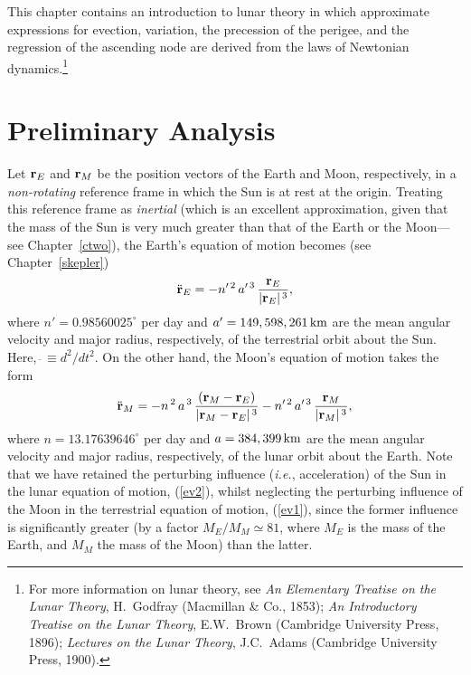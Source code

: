 This chapter contains an introduction to lunar theory in which approximate expressions for evection, variation,
the precession of the perigee,  and the regression of the ascending node are derived from the  laws of Newtonian dynamics.\footnote{For more information on lunar theory, see  {\em An Elementary Treatise on the Lunar Theory}, H.~Godfray (Macmillan \& Co.,  1853);  {\em An Introductory Treatise on the Lunar Theory}, E.W.~Brown (Cambridge University Press, 1896); {\em Lectures on the Lunar Theory}, J.C.~Adams (Cambridge University Press, 1900).}

\section{Preliminary Analysis}
Let ${\bf r}_E$ and ${\bf r}_M$ be the position vectors of the Earth and Moon, respectively, in a  {\em non-rotating}\/
reference frame in which the Sun is at rest at the origin.  Treating this reference frame as {\em inertial}\/  (which  is an
excellent  approximation, given that the  mass of the Sun is very much greater than that of the Earth or the Moon---see Chapter~\ref{ctwo}),
the Earth's
equation of motion becomes (see Chapter~\ref{skepler})
\begin{equation}\label{ev1}
\ddot{\bf r}_E  = - n'^{\,2}\,a'^{\,3}\,\frac{{\bf r}_E}{|{\bf r}_E|^{\,3}},
\end{equation}
where $n'=0.98560025^\circ$ per day and $a'=149,598,261\,{\rm km}$ are the mean angular velocity and major radius, respectively, of the
terrestrial orbit about the Sun. Here, $\ddot{~}\equiv d^2/dt^2$. On the other hand, the Moon's equation of motion takes the form
\begin{equation}\label{ev2}
\ddot{\bf r}_M  = - n^{\,2}\,a^{\,3}\,\frac{({\bf r}_M-{\bf r}_E)}{|{\bf r}_M-{\bf r}_E|^{\,3}} - n'^{\,2}\,a'^{\,3}\,\frac{{\bf r}_M}{|{\bf r}_M|^{\,3}},
\end{equation}
where $n=13.17639646^\circ$ per day  and $a=384,399\,{\rm km}$ are the mean angular velocity and major radius, respectively, of the lunar 
orbit about the Earth. Note that we have retained the perturbing influence ({\em i.e.}, acceleration) of the Sun in the
lunar equation of motion, (\ref{ev2}), whilst  neglecting the perturbing influence of the Moon in the terrestrial
equation of motion, (\ref{ev1}), since the former influence is significantly greater (by a factor $M_E/M_M\simeq 81$, where $M_E$ is the mass of the
Earth, and $M_M$ the mass of the Moon) than the latter. 

